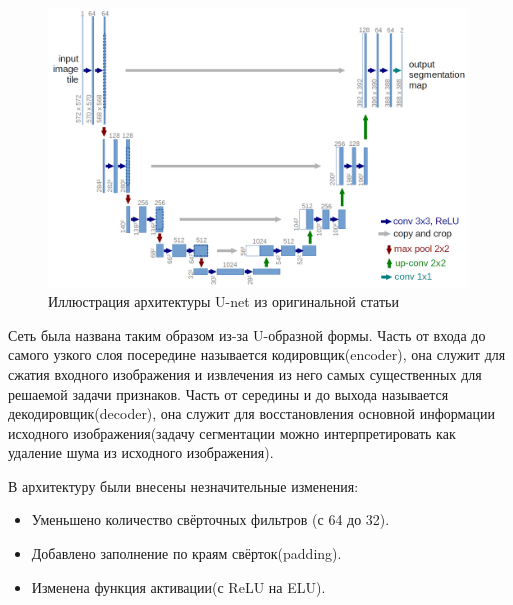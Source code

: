 \documentclass[12pt, a4paper]{extarticle}
\begin{document}
\begin{figure}[h!]
\includegraphics[width=0.99\textwidth]{data/images/u-net-architecture.png}
\caption{Иллюстрация архитектуры U-net из оригинальной статьи \cite{6}}
\label{unet_arch}
\end{figure}

Сеть была названа таким образом из-за U-образной формы. Часть от входа до самого узкого слоя посередине называется кодировщик(encoder), она служит для сжатия входного изображения и извлечения из него самых существенных для решаемой задачи признаков. 
Часть от середины и до выхода называется декодировщик(decoder), она служит для восстановления основной информации исходного изображения(задачу сегментации можно интерпретировать как удаление шума из исходного изображения).

В архитектуру \cite{6} были внесены незначительные изменения:
\begin{itemize}
	\item Уменьшено количество свёрточных фильтров (с 64 до 32).
	
	\item Добавлено заполнение по краям свёрток(padding).
	
	\item Изменена функция активации(с ReLU на ELU).
\end{itemize}
\end{document}
